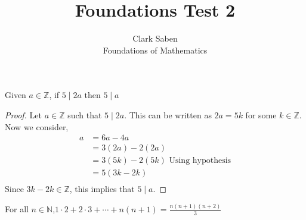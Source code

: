 \documentclass[12pt]{article}
\newenvironment{theorem}[2][Theorem]{\begin{trivlist}
\item[\hskip \labelsep {\bfseries #1}\hskip \labelsep {\bfseries #2.}]}{\end{trivlist}}
\begin{document}
 
 
\title{Foundations Test 2}%
\author{Clark Saben\\ %
Foundations of Mathematics} %
 
\maketitle

\section{}
\begin{theorem}1
	Given $a \in \mathbb{Z}$, if $5\mid2a$ then $5\mid a$
\end{theorem}
\begin{proof}
	Let $a \in \mathbb{Z}$ such that $5\mid2a$. This can be written as
	$2a = 5k$ for some $k \in \mathbb{Z}$. Now we consider,
	\begin{align*}
		a &=6a-4a\\
		  &=3(2a)-2(2a)\\
		  &=3(5k)-2(5k) \text{ Using hypothesis}\\
		  &=5(3k-2k)\\
	\end{align*}
	Since $3k-2k \in \mathbb{Z}$, this implies that $5\mid a$.

\end{proof}
\begin{theorem}{3}
	For all $n \in \mathbb{N}$,$ 1\cdot2 + 2\cdot3 + \cdots + n(n+1) = \frac{n(n+1)(n+2)}{3}$
\end{theorem}
\end{document}
